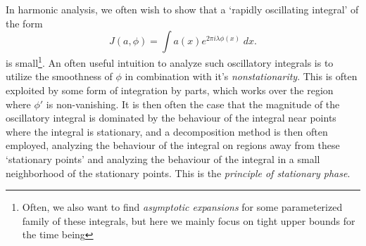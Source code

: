 	\begin{comment}


	\chapter{AKC - Trigonometric Integrals (1980)}

	Let's list the results of AKC, which give some Van der Corput type estimates for one dimensional integrals:
	\begin{itemize}
		\item If $n > 1$ and $|\partial^n \phi| \geq A$, then
		\[ J(1,\phi) \leq \min(|I|, 6nA^{-1/n}). \]
		If $a$ is piecewise monotonic and continuous (on at most $p$ pieces), with $L^\infty$ norm at most $H$< then
		\[ J(a,\phi) \leq H \min(1, 24pn A^{-1/n}). \]

		\item If $n \geq 1$, and $\phi(x) = \alpha_n x^n + \dots + \alpha_1 x$, and
		\[ H = \min_{x \in I} \sum_r \frac{|(\partial^r \phi)(x)|}{r!}, \]
		then
		\[ J(1,\phi) \leq \min(|I|,6en^3H^{-1}). \]
	\end{itemize}

	\end{comment}








	


	In harmonic analysis, we often wish to show that a `rapidly oscillating integral' of the form
	\[ J(a,\phi) = \int a(x) e^{2 \pi i \lambda \phi(x)}\; dx. \]
	is small\footnote{Often, we also want to find \emph{asymptotic expansions} for some parameterized family of these integrals, but here we mainly focus on tight upper bounds for the time being}. An often useful intuition to analyze such oscillatory integrals is to utilize the smoothness of $\phi$ in combination with it's \emph{nonstationarity}. This is often exploited by some form of integration by parts, which works over the region where $\phi'$ is non-vanishing. It is then often the case that the magnitude of the oscillatory integral is dominated by the behaviour of the integral near points where the integral is stationary, and a decomposition method is then often employed, analyzing the behaviour of the integral on regions away from these `stationary points' and analyzing the behaviour of the integral in a small neighborhood of the stationary points. This is the \emph{principle of stationary phase}.




